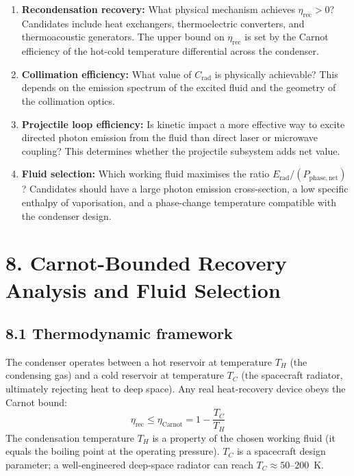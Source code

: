 \documentclass[12pt]{article}
\begin{document}
\begin{enumerate}
  \item \textbf{Recondensation recovery:} What physical mechanism achieves
        $\eta_{\mathrm{rec}} > 0$? Candidates include heat exchangers, thermoelectric
        converters, and thermoacoustic generators. The upper bound on
        $\eta_{\mathrm{rec}}$ is set by the Carnot efficiency of the hot-cold
        temperature differential across the condenser.
  \item \textbf{Collimation efficiency:} What value of $C_{\mathrm{rad}}$ is
        physically achievable? This depends on the emission spectrum of the excited
        fluid and the geometry of the collimation optics.
  \item \textbf{Projectile loop efficiency:} Is kinetic impact a more effective way
        to excite directed photon emission from the fluid than direct laser or
        microwave coupling? This determines whether the projectile subsystem adds
        net value.
  \item \textbf{Fluid selection:} Which working fluid maximises the ratio
        $E_{\mathrm{rad}} / (P_{\mathrm{phase,net}})$? Candidates should have a
        large photon emission cross-section, a low specific enthalpy of vaporisation,
        and a phase-change temperature compatible with the condenser design.
\end{enumerate}


\section*{8. Carnot-Bounded Recovery Analysis and Fluid Selection}

\subsection*{8.1 Thermodynamic framework}

The condenser operates between a hot reservoir at temperature $T_H$ (the
condensing gas) and a cold reservoir at temperature $T_C$ (the spacecraft
radiator, ultimately rejecting heat to deep space). Any real heat-recovery
device obeys the Carnot bound:
\[
  \eta_{\mathrm{rec}} \leq \eta_{\mathrm{Carnot}} = 1 - \frac{T_C}{T_H}
\]
The condensation temperature $T_H$ is a property of the chosen working fluid
(it equals the boiling point at the operating pressure). $T_C$ is a spacecraft
design parameter; a well-engineered deep-space radiator can reach
$T_C \approx 50$--$200$~K.
\end{document}
